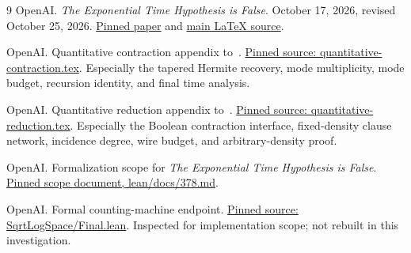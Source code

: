 \documentclass[11pt,letterpaper]{article}
\numberwithin{equation}{section}
\theoremstyle{definition}
\theoremstyle{remark}
\begin{document}
\clearpage
\begin{thebibliography}{9}
OpenAI. \emph{The Exponential Time Hypothesis is False}.
October 17, 2026, revised October 25, 2026.
\href{https://github.com/openai/math/blob/42907c9e999cc00d6abe7a50bfc1023250edd1b9/preprints/The-Exponential-Time-Hypothesis-is-False-October-25-2026/paper.pdf}{Pinned paper} and
\href{https://github.com/openai/math/blob/42907c9e999cc00d6abe7a50bfc1023250edd1b9/preprints/The-Exponential-Time-Hypothesis-is-False-October-25-2026/build/main_full_version.tex}{main LaTeX source}.

OpenAI. Quantitative contraction appendix to~\cite{paper}.
\href{https://github.com/openai/math/blob/42907c9e999cc00d6abe7a50bfc1023250edd1b9/preprints/The-Exponential-Time-Hypothesis-is-False-October-25-2026/build/quantitative-contraction.tex}{Pinned source: quantitative-contraction.tex}.
Especially the tapered Hermite recovery, mode multiplicity, mode budget,
recursion identity, and final time analysis.

OpenAI. Quantitative reduction appendix to~\cite{paper}.
\href{https://github.com/openai/math/blob/42907c9e999cc00d6abe7a50bfc1023250edd1b9/preprints/The-Exponential-Time-Hypothesis-is-False-October-25-2026/build/quantitative-reduction.tex}{Pinned source: quantitative-reduction.tex}.
Especially the Boolean contraction interface, fixed-density clause
network, incidence degree, wire budget, and arbitrary-density proof.

OpenAI. Formalization scope for \emph{The Exponential Time Hypothesis is
False}. \href{https://github.com/openai/math/blob/42907c9e999cc00d6abe7a50bfc1023250edd1b9/lean/docs/378.md}{Pinned scope document, lean/docs/378.md}.

OpenAI. Formal counting-machine endpoint.
\href{https://github.com/openai/math/blob/42907c9e999cc00d6abe7a50bfc1023250edd1b9/lean/OAI/Algorithms/SubexponentialSAT/SqrtLogSpace/Final.lean}{Pinned source: SqrtLogSpace/Final.lean}.
Inspected for implementation scope; not rebuilt in this investigation.
\end{thebibliography}
\end{document}
